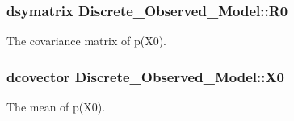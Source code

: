 \hypertarget{class_discrete___observed___model_38c08725ba4da3181ca6efe7ccf77875}{
\subsubsection[{R0}]{\setlength{\rightskip}{0pt plus 5cm}dsymatrix {\bf Discrete\_\-Observed\_\-Model::R0}}}
\label{class_discrete___observed___model_38c08725ba4da3181ca6efe7ccf77875}


The covariance matrix of p(X0). 

\hypertarget{class_discrete___observed___model_ad95b6c00770d99943f579ab4511095c}{
\subsubsection[{X0}]{\setlength{\rightskip}{0pt plus 5cm}dcovector {\bf Discrete\_\-Observed\_\-Model::X0}}}
\label{class_discrete___observed___model_ad95b6c00770d99943f579ab4511095c}


The mean of p(X0). 

